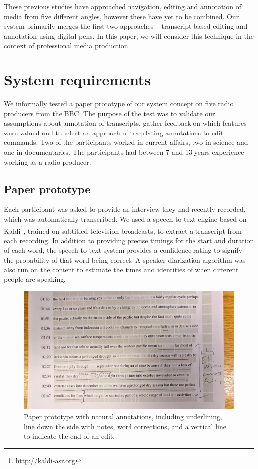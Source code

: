 These previous studies have approached navigation, editing and annotation of media from five different angles, however
these have yet to be combined.  Our system primarily merges the first two approaches -- transcript-based editing and
annotation using digital pens. In this paper, we will consider this technique in the context of professional media
production.

\section{System requirements}
We informally tested a paper prototype of our system concept on five radio producers from the BBC. The purpose of the
test was to validate our assumptions about annotation of transcripts, gather feedback on which features were valued and
to select an approach of translating annotations to edit commands.  Two of the participants worked in current affairs,
two in science and one in documentaries. The participants had between 7 and 13 years experience working as a radio
producer.

\subsection{Paper prototype}
Each participant was asked to provide an interview they had recently recorded, which was automatically transcribed.  We
used a speech-to-text engine based on Kaldi\footnote{\url{http://kaldi-asr.org}}, trained on subtitled television
broadcasts, to extract a transcript from each recording. In addition to providing precise timings for the start and
duration of each word, the speech-to-text system provides a confidence rating to signify the probability of that word
being correct. A speaker diarization \citep{AngueraMiro2012} algorithm was also run on the content to estimate the
times and identities of when different people are speaking.

\begin{figure}[h]
  \centering
  \includegraphics[width=\columnwidth]{figs/mockup}
  \caption{Paper prototype with natural annotations, including
    underlining, line down the side with notes, word corrections, and a
    vertical line to indicate the end of an edit.}
  \label{fig:natural}
\end{figure}

